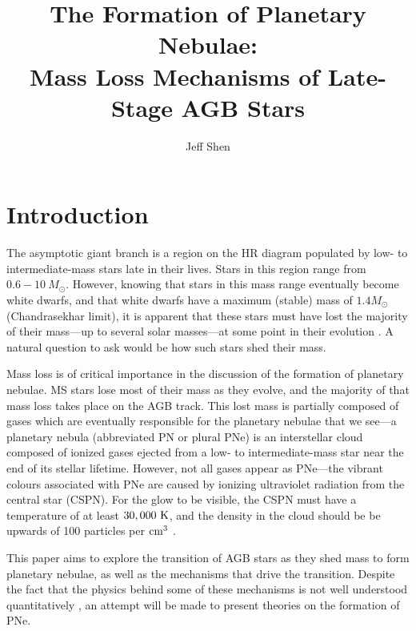 \documentclass[twocolumn]{aastex63}
\begin{document}
\author{Jeff Shen}
\title{The Formation of Planetary Nebulae: \\
Mass Loss Mechanisms of Late-Stage AGB Stars} 


\section{Introduction} \label{sec:intro}

The asymptotic giant branch is a region on the HR diagram populated by low- to intermediate-mass stars late in their lives. Stars in this region range from $0.6-10~M_\odot$. However, knowing that stars in this mass range eventually become white dwarfs, and that white dwarfs have a maximum (stable) mass of $1.4 M_\odot$ (Chandrasekhar limit), it is apparent that these stars must have lost the majority of their mass—up to several solar masses—at some point in their evolution \cite{willson}. A natural question to ask would be how such stars shed their mass. 

Mass loss is of critical importance in the discussion of the formation of planetary nebulae. MS stars lose most of their mass as they evolve, and the majority of that mass loss takes place on the AGB track. This lost mass is partially composed of gases which are eventually responsible for the planetary nebulae that we see—a planetary nebula (abbreviated PN or plural PNe) is an interstellar cloud composed of ionized gases ejected from a low- to intermediate-mass star near the end of its stellar lifetime. However, not all gases appear as PNe—the vibrant colours associated with PNe are caused by ionizing ultraviolet radiation from the central star (CSPN). For the glow to be visible, the CSPN must have a temperature of at least $30,000~{\rm K}$, and the density in the cloud should be be upwards of 100 particles per ${\rm cm^{3}}$ \citep{prialnik}.

This paper aims to explore the transition of AGB stars as they shed mass to form planetary nebulae, as well as the mechanisms that drive the transition. Despite the fact that the physics behind some of these mechanisms is not well understood quantitatively \citep{blocker}, an attempt will be made to present theories on the formation of PNe.

\vfill \null
\columnbreak
\end{document}
